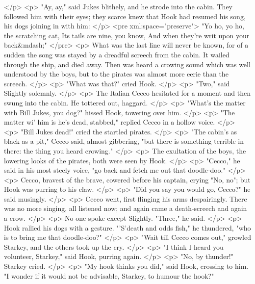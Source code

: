     </p>
    <p>
      "Ay, ay," said Jukes blithely, and he strode into the cabin. They followed
      him with their eyes; they scarce knew that Hook had resumed his song, his
      dogs joining in with him:
    </p>
<pre xml:space="preserve">
"Yo ho, yo ho, the scratching cat,
Its tails are nine, you know,
And when they're writ upon your back&mdash;"
</pre>
    <p>
      What was the last line will never be known, for of a sudden the song was
      stayed by a dreadful screech from the cabin. It wailed through the ship,
      and died away. Then was heard a crowing sound which was well understood by
      the boys, but to the pirates was almost more eerie than the screech.
    </p>
    <p>
      "What was that?" cried Hook.
    </p>
    <p>
      "Two," said Slightly solemnly.
    </p>
    <p>
      The Italian Cecco hesitated for a moment and then swung into the cabin. He
      tottered out, haggard.
    </p>
    <p>
      "What's the matter with Bill Jukes, you dog?" hissed Hook, towering over
      him.
    </p>
    <p>
      "The matter wi' him is he's dead, stabbed," replied Cecco in a hollow
      voice.
    </p>
    <p>
      "Bill Jukes dead!" cried the startled pirates.
    </p>
    <p>
      "The cabin's as black as a pit," Cecco said, almost gibbering, "but there
      is something terrible in there: the thing you heard crowing."
    </p>
    <p>
      The exultation of the boys, the lowering looks of the pirates, both were
      seen by Hook.
    </p>
    <p>
      "Cecco," he said in his most steely voice, "go back and fetch me out that
      doodle-doo."
    </p>
    <p>
      Cecco, bravest of the brave, cowered before his captain, crying "No, no";
      but Hook was purring to his claw.
    </p>
    <p>
      "Did you say you would go, Cecco?" he said musingly.
    </p>
    <p>
      Cecco went, first flinging his arms despairingly. There was no more
      singing, all listened now; and again came a death-screech and again a
      crow.
    </p>
    <p>
      No one spoke except Slightly. "Three," he said.
    </p>
    <p>
      Hook rallied his dogs with a gesture. "'S'death and odds fish," he
      thundered, "who is to bring me that doodle-doo?"
    </p>
    <p>
      "Wait till Cecco comes out," growled Starkey, and the others took up the
      cry.
    </p>
    <p>
      "I think I heard you volunteer, Starkey," said Hook, purring again.
    </p>
    <p>
      "No, by thunder!" Starkey cried.
    </p>
    <p>
      "My hook thinks you did," said Hook, crossing to him. "I wonder if it
      would not be advisable, Starkey, to humour the hook?"
